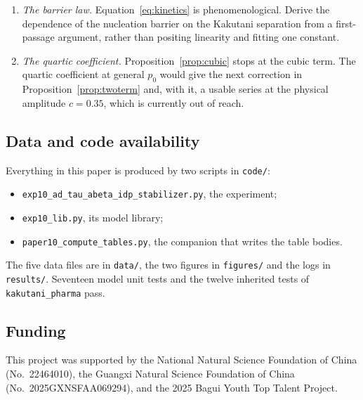 \documentclass[11pt,reqno]{amsart}
\theoremstyle{plain}
\theoremstyle{definition}
\theoremstyle{remark}
\numberwithin{equation}{section}
\newcommand{\pkg}{\texttt{kakutani\_pharma}}
\begin{document}
\begin{enumerate}[label=\textup{(\arabic*)},leftmargin=2.4em,itemsep=4pt]
\item \emph{The barrier law.} Equation~\eqref{eq:kinetics} is phenomenological. Derive the dependence of the nucleation barrier on the Kakutani separation from a first-passage argument, rather than positing linearity and fitting one constant.
\item \emph{The quartic coefficient.} Proposition~\ref{prop:cubic} stops at the cubic term. The quartic coefficient at general $p_0$ would give the next correction in Proposition~\ref{prop:twoterm} and, with it, a usable series at the physical amplitude $c=0.35$, which is currently out of reach.
\end{enumerate}

\subsection*{Data and code availability}
Everything in this paper is produced by two scripts in \texttt{code/}:
\begin{itemize}[leftmargin=1.6em,itemsep=2pt]
\item \texttt{exp10\_ad\_tau\_abeta\_idp\_stabilizer.py}, the experiment;
\item \texttt{exp10\_lib.py}, its model library;
\item \texttt{paper10\_compute\_tables.py}, the companion that writes the table bodies.
\end{itemize}
The five data files are in \texttt{data/}, the two figures in \texttt{figures/} and the logs in \texttt{results/}. Seventeen model unit tests and the twelve inherited tests of \pkg{} pass.

\subsection*{Funding}
This project was supported by the National Natural Science Foundation of China (No.~22464010), the Guangxi Natural Science Foundation of China (No.~2025GXNSFAA069294), and the 2025 Bagui Youth Top Talent Project.
\end{document}
